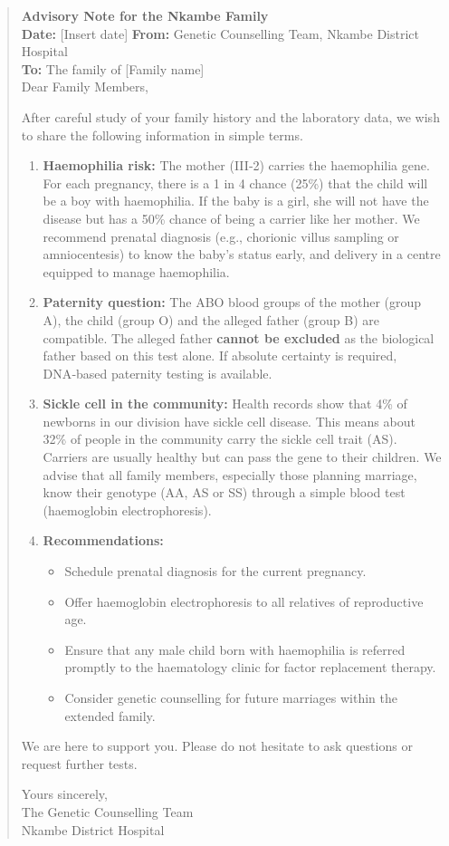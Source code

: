 \documentclass[11pt]{article}
\begin{document}
\begin{quote}
\textbf{Advisory Note for the Nkambe Family}\\
\textbf{Date:} [Insert date] \quad \textbf{From:} Genetic Counselling Team, Nkambe District Hospital\\
\textbf{To:} The family of [Family name]\\

Dear Family Members,

After careful study of your family history and the laboratory data, we wish to share the following information in simple terms.

\begin{enumerate}
    \item \textbf{Haemophilia risk:} The mother (III‑2) carries the haemophilia gene. For each pregnancy, there is a 1 in 4 chance (25\%) that the child will be a boy with haemophilia. If the baby is a girl, she will not have the disease but has a 50\% chance of being a carrier like her mother. We recommend prenatal diagnosis (e.g., chorionic villus sampling or amniocentesis) to know the baby’s status early, and delivery in a centre equipped to manage haemophilia.
    \item \textbf{Paternity question:} The ABO blood groups of the mother (group A), the child (group O) and the alleged father (group B) are compatible. The alleged father \textbf{cannot be excluded} as the biological father based on this test alone. If absolute certainty is required, DNA‑based paternity testing is available.
    \item \textbf{Sickle cell in the community:} Health records show that 4\% of newborns in our division have sickle cell disease. This means about 32\% of people in the community carry the sickle cell trait (AS). Carriers are usually healthy but can pass the gene to their children. We advise that all family members, especially those planning marriage, know their genotype (AA, AS or SS) through a simple blood test (haemoglobin electrophoresis).
    \item \textbf{Recommendations:}
    \begin{itemize}
        \item Schedule prenatal diagnosis for the current pregnancy.
        \item Offer haemoglobin electrophoresis to all relatives of reproductive age.
        \item Ensure that any male child born with haemophilia is referred promptly to the haematology clinic for factor replacement therapy.
        \item Consider genetic counselling for future marriages within the extended family.
    \end{itemize}
\end{enumerate}

We are here to support you. Please do not hesitate to ask questions or request further tests.

Yours sincerely,\\
The Genetic Counselling Team\\
Nkambe District Hospital
\end{quote}
\end{document}
